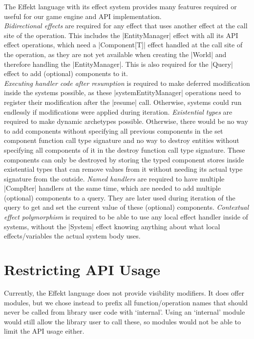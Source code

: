 The Effekt language with its effect system provides many features required or useful for our game engine and API implementation.\\
\textit{Bidirectional effects} are required for any effect that uses another effect at the call site of the operation. This includes the |EntityManager| effect with all its API effect operations, which need a |Component[T]| effect handled at the call site of the operation, as they are not yet available when creating the |World| and therefore handling the |EntityManager|. This is also required for the |Query| effect to add (optional) components to it.\\
\textit{Executing handler code after resumption} is required to make deferred modification inside the systems possible, as these |systemEntityManager| operations need to register their modification after the |resume| call. Otherwise, systems could run endlessly if modifications were applied during iteration.
\textit{Existential types} are required to make dynamic archetypes possible. Otherwise, there would be no way to add components without specifying all previous components in the set component function call type signature and no way to destroy entities without specifying all components of it in the destroy function call type signature. These components can only be destroyed by storing the typed component stores inside existential types that can remove values from it without needing its actual type signature from the outside.
\textit{Named handlers} are required to have multiple |CompIter| handlers at the same time, which are needed to add multiple (optional) components to a query. They are later used during iteration of the query to get and set the current value of these (optional) components.
\textit{Contextual effect polymorphism} is required to be able to use any local effect handler inside of systems, without the |System| effect knowing anything about what local effects/variables the actual system body uses.

\section{Restricting API Usage}

Currently, the Effekt language does not provide visibility modifiers. It does offer modules, but we chose instead to prefix all function/operation names that should never be called from library user code with `internal'. Using an `internal' module would still allow the library user to call these, so modules would not be able to limit the API usage either.

